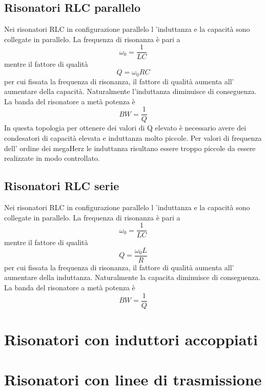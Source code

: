 \documentclass[10pt,a4paper]{book}
\begin{document}
\subsection{Risonatori RLC parallelo}
Nei risonatori RLC in configurazione parallelo l 'induttanza e la capacità sono collegate in parallelo.
La frequenza di risonanza è pari a
\begin{equation}
\omega_0 = \frac{1}{L C}
\end{equation}
mentre il fattore di qualità 
\begin{equation}
Q = \omega_0 R C
\end{equation}
per cui fissata la frequenza di risonanza, il fattore di qualità aumenta all' aumentare della capacità. Naturalmente l'induttanza diminuisce di conseguenza.
La banda del risonatore a metà potenza è
\begin{equation}
BW  = \frac{1}{Q}
\end{equation}
In questa topologia per ottenere dei valori di Q elevato è necessario avere dei condesatori di capacità elevata e induttanza molto piccole. Per valori di frequenza dell' ordine dei megaHerz le induttanza risultano essere troppo piccole da essere realizzate in modo controllato. 
\subsection{Risonatori RLC serie}
Nei risonatori RLC in configurazione parallelo l 'induttanza e la capacità sono collegate in parallelo.
La frequenza di risonanza è pari a
\begin{equation}
\omega_0 = \frac{1}{L C}
\end{equation}
mentre il fattore di qualità 
\begin{equation}
Q = \frac{\omega_0 L}{R}
\end{equation}
per cui fissata la frequenza di risonanza, il fattore di qualità aumenta all' aumentare della induttanza. Naturalmente la capacita  diminuisce di conseguenza.
La banda del risonatore a metà potenza è
\begin{equation}
BW  = \frac{1}{Q}
\end{equation}

\section{Risonatori con induttori accoppiati}
\section{Risonatori con linee di trasmissione}
\end{document}
